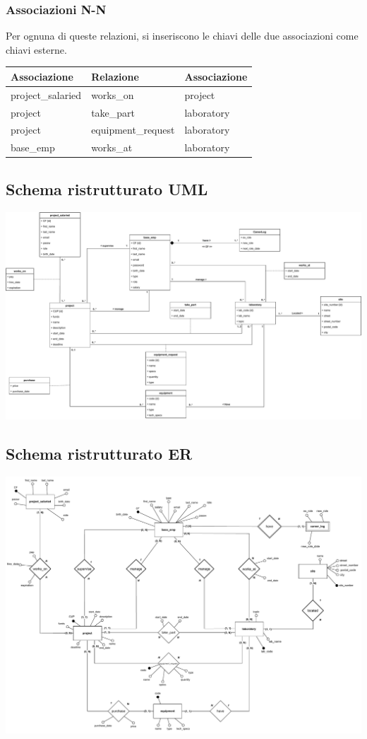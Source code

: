 \subsubsection{Associazioni N-N}
Per ognuna di queste relazioni, si inseriscono le chiavi delle due associazioni come chiavi esterne.\meskip
\begin{tabular}{@{}| l | l | l |}
	\hline
	\textbf{Associazione} & \textbf{Relazione} & \textbf{Associazione} \\
	\hline
	project\_salaried     & works\_on          & project               \\
	\hline
	project               & take\_part         & laboratory            \\
	\hline
	project               & equipment\_request & laboratory            \\
	\hline
	base\_emp             & works\_at          & laboratory            \\
	\hline
\end{tabular}
\newpage
\subsection{Schema ristrutturato UML}
\bigskip \includegraphics[width=\textwidth]{images/Ristrutturato-UML.drawio.pdf}


\subsection{Schema ristrutturato ER}
\bigskip \includegraphics[width=\textwidth]{images/Ristrutturato-ER.drawio.pdf}



